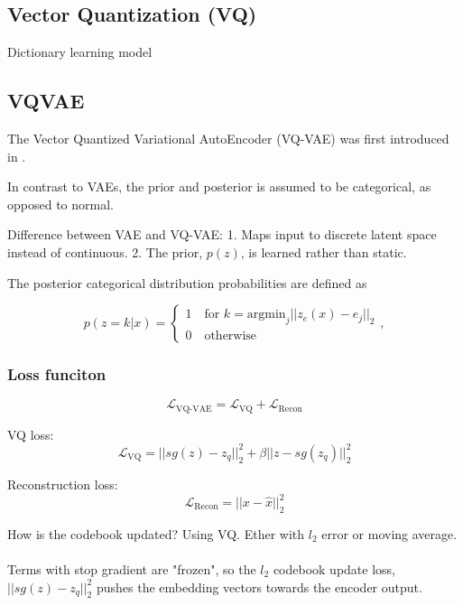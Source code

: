\documentclass[../../thesis.tex]{subfiles}
\begin{document}
\subsection{Vector Quantization (VQ)}
Dictionary learning model \cite{Gray1984VQ}

\subsection{VQVAE}
The Vector Quantized Variational AutoEncoder (VQ-VAE) was first introduced in \cite{VQVAE}. 

In contrast to VAEs, the prior and posterior is assumed to be categorical, as opposed to normal. 

Difference between VAE and VQ-VAE: 1. Maps input to discrete latent space instead of continuous. 2. The prior, $p(z)$, is learned rather than static.

The posterior categorical distribution probabilities are defined as

\begin{equation}
    p(z=k | x) = 
    \begin{cases} 
        1 \quad \text{for }k = \textrm{argmin}_j||z_e(x) - e_j||_2 \\
        0 \quad \text{otherwise}
    \end{cases},
\end{equation}


\subsubsection{Loss funciton}
\begin{equation}
    \mathcal{L}_{\text{VQ-VAE}} = \mathcal{L}_{\text{VQ}} + \mathcal{L}_{\text{Recon}}
\end{equation}


VQ loss: 
\begin{equation}
    \mathcal{L}_{\text{VQ}} = ||sg(z) - z_q||_2^2 +\beta||z - sg(z_q)||_2^2
\end{equation}
     
Reconstruction loss:
\begin{equation}
    \mathcal{L}_{\text{Recon}} = ||x - \widehat{x}||_2^2
\end{equation}

How is the codebook updated? Using VQ. Ether with $l_2$ error or moving average. \\\\

Terms with stop gradient are "frozen", so the $l_2$ codebook update loss, $||sg(z) - z_q ||_2^2$ pushes the embedding vectors towards the encoder output. 
\end{document}
